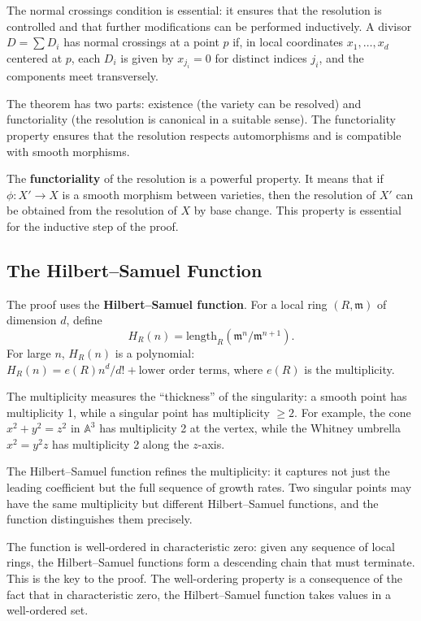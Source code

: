 The normal crossings condition is essential: it ensures that the resolution is controlled and that further modifications can be performed inductively. A divisor $D = \sum D_i$ has normal crossings at a point $p$ if, in local coordinates $x_1, \ldots, x_d$ centered at $p$, each $D_i$ is given by $x_{j_i} = 0$ for distinct indices $j_i$, and the components meet transversely.

The theorem has two parts: existence (the variety can be resolved) and functoriality (the resolution is canonical in a suitable sense). The functoriality property ensures that the resolution respects automorphisms and is compatible with smooth morphisms.

The \textbf{functoriality} of the resolution is a powerful property. It means that if $\phi: X' \to X$ is a smooth morphism between varieties, then the resolution of $X'$ can be obtained from the resolution of $X$ by base change. This property is essential for the inductive step of the proof.

\subsection*{The Hilbert--Samuel Function}

The proof uses the \textbf{Hilbert--Samuel function}. For a local ring $(R, \mathfrak{m})$ of dimension $d$, define
\[
H_R(n) = \text{length}_R(\mathfrak{m}^n / \mathfrak{m}^{n+1}).
\]
For large $n$, $H_R(n)$ is a polynomial: $H_R(n) = e(R) n^d / d! + \text{lower order terms}$, where $e(R)$ is the multiplicity.

The multiplicity measures the ``thickness'' of the singularity: a smooth point has multiplicity 1, while a singular point has multiplicity $\geq 2$. For example, the cone $x^2 + y^2 = z^2$ in $\mathbb{A}^3$ has multiplicity 2 at the vertex, while the Whitney umbrella $x^2 = y^2 z$ has multiplicity 2 along the $z$-axis.

The Hilbert--Samuel function refines the multiplicity: it captures not just the leading coefficient but the full sequence of growth rates. Two singular points may have the same multiplicity but different Hilbert--Samuel functions, and the function distinguishes them precisely.

The function is well-ordered in characteristic zero: given any sequence of local rings, the Hilbert--Samuel functions form a descending chain that must terminate. This is the key to the proof. The well-ordering property is a consequence of the fact that in characteristic zero, the Hilbert--Samuel function takes values in a well-ordered set.

